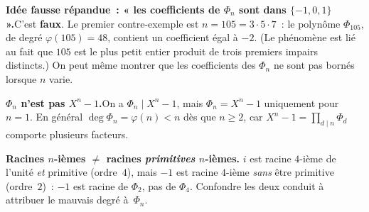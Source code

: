 \begin{mdframed}[style=cexbar]
  \textbf{Idée fausse répandue~: « les coefficients de $\Phi_n$ sont dans
  $\{-1,0,1\}$ ».}\enspace C'est \textbf{faux}. Le premier contre-exemple est
  $n=105=3\cdot 5\cdot 7$~: le polynôme $\Phi_{105}$, de degré
  $\varphi(105)=48$, contient un coefficient égal à $-2$. (Le phénomène est lié
  au fait que $105$ est le plus petit entier produit de trois premiers impairs
  distincts.) On peut même montrer que les coefficients des $\Phi_n$ ne sont pas
  bornés lorsque $n$ varie.

  \smallskip\noindent
  \textbf{$\Phi_n$ n'est pas $X^n-1$.}\enspace On a $\Phi_n\mid X^n-1$, mais
  $\Phi_n=X^n-1$ uniquement pour $n=1$. En général $\deg\Phi_n=\varphi(n)<n$
  dès que $n\geq 2$, car $X^n-1=\prod_{d\mid n}\Phi_d$ comporte plusieurs
  facteurs.

  \smallskip\noindent
  \textbf{Racines $n$-ièmes $\neq$ racines \emph{primitives} $n$-ièmes.}\enspace
  $i$ est racine $4$-ième de l'unité \emph{et} primitive (ordre~$4$), mais
  $-1$ est racine $4$-ième \emph{sans} être primitive (ordre~$2$)~:
  $-1$ est racine de $\Phi_2$, pas de $\Phi_4$. Confondre les deux conduit à
  attribuer le mauvais degré à~$\Phi_n$.
\end{mdframed}

\vspace{6pt}
\exolabel

